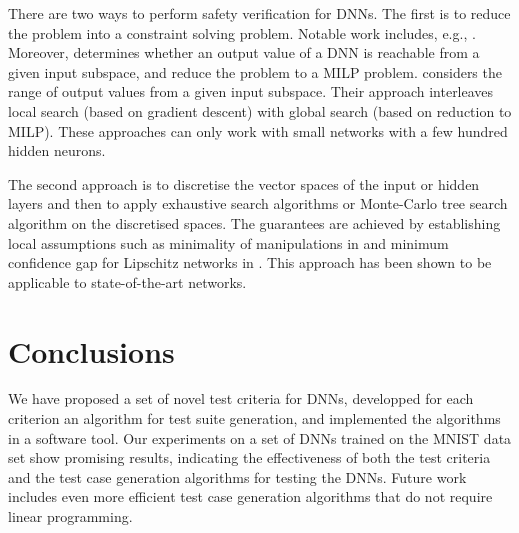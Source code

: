 \documentclass[runningheads,a4paper]{llncs}
\begin{document}
There are two ways to perform safety verification for DNNs.  The first is
to reduce the problem into a constraint solving problem.  Notable work
includes, e.g., \cite{PT2010,katz2017reluplex}.
Moreover, 
determines whether an output value of a DNN is reachable from a given input
subspace, and reduce the problem to a MILP problem.  \cite{dutta2017output}
considers the range of output values from a given input subspace.  Their
approach interleaves local search (based on gradient descent) with global
search (based on reduction to MILP).  These approaches can only work with
small networks
with a few hundred hidden neurons. 

The second approach is to discretise the vector spaces of the input or hidden layers
and then to apply exhaustive search algorithms or Monte-Carlo tree search
algorithm on the discretised spaces.  The guarantees are achieved by
establishing local assumptions such as minimality of manipulations in
\cite{HKWW2017} and minimum confidence gap for Lipschitz networks in
\cite{WHK2018}.  This approach has been shown to be applicable to
state-of-the-art networks.

\section{Conclusions}\label{sec:concl}

We have proposed a set of novel test criteria for DNNs, developped for each
criterion an algorithm for test suite generation, and implemented the
algorithms in a software tool.  Our experiments on a set of DNNs trained on
the MNIST data set show promising results, indicating the effectiveness of
both the test criteria and the test case generation algorithms for testing
the DNNs.  Future work includes even more efficient test case generation
algorithms that do not require linear programming.




\end{document}
